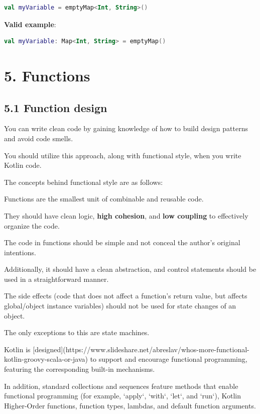 {{{{\begin{lstlisting}[language=Kotlin]
val myVariable = emptyMap<Int, String>()
\end{lstlisting}


\textbf{Valid example}:

\begin{lstlisting}[language=Kotlin]
val myVariable: Map<Int, String> = emptyMap()
\end{lstlisting}
\section*{\textbf{5. Functions}}

\subsection*{\textbf{5.1 Function design}}

You can write clean code by gaining knowledge of how to build design patterns and avoid code smells.

You should utilize this approach, along with functional style, when you write Kotlin code.

The concepts behind functional style are as follows:

Functions are the smallest unit of combinable and reusable code.

They should have clean logic, \textbf{high cohesion}, and \textbf{low coupling} to effectively organize the code.

The code in functions should be simple and not conceal the author's original intentions.

Additionally, it should have a clean abstraction, and control statements should be used in a straightforward manner.

The side effects (code that does not affect a function's return value, but affects global/object instance variables) should not be used for state changes of an object.

The only exceptions to this are state machines.



Kotlin is [designed](https://www.slideshare.net/abreslav/whos-more-functional-kotlin-groovy-scala-or-java) to support and encourage functional programming, featuring the corresponding built-in mechanisms.

In addition, standard collections and sequences feature methods that enable functional programming (for example, `apply`, `with`, `let`, and `run`), Kotlin Higher-Order functions, function types, lambdas, and default function arguments.

}}}}

